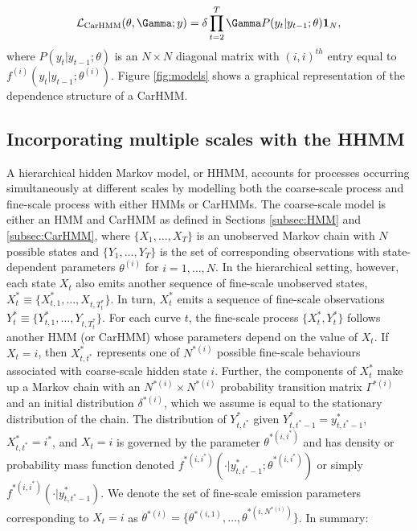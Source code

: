 \begin{equation*}
    \calL_{\text{CarHMM}}(\theta,\Gamma;y) = \delta \prod_{t=2}^T \Gamma P(y_t|y_{t-1};\theta) \mathbf{1}_N,
    \label{eqn:CarHMM_likelihood}
\end{equation*}
where
%
$P(y_t|y_{t-1};\theta)$ is an $N \times N$ diagonal matrix with $(i,i)^{th}$ entry equal to $f^{(i)}(y_t|y_{t-1}; \theta^{(i)})$. Figure \ref{fig:models} shows a graphical representation of the dependence structure of a CarHMM. 

\subsection{Incorporating multiple scales with the HHMM}
\label{subsec:HHMM}

A hierarchical hidden Markov model, or HHMM, accounts for processes occurring simultaneously at different scales by modelling both the coarse-scale process and fine-scale process with either HMMs \citep{Barajas:2017,Adam:2019} or CarHMMs. The coarse-scale model is either an HMM and CarHMM as defined in Sections \ref{subsec:HMM} and \ref{subsec:CarHMM}, where $\{X_1, \ldots, X_T\}$ is an unobserved Markov chain with $N$ possible states and $\{Y_1, \ldots, Y_T\}$ is the set of corresponding observations with state-dependent parameters $\theta^{(i)}$ for $i = 1,\ldots,N$.   
%
In the hierarchical setting, however, each state $X_t$ also emits another sequence of fine-scale unobserved states, $X^*_t \equiv \{X_{t,1}^*,\ldots, X_{t,T_t^*}\}$. In turn, $X^*_t$ emits a sequence of fine-scale observations $Y^*_t \equiv \{Y_{t,1}^*,\ldots, Y_{t,T_t^*}\}$. For each curve $t$, the fine-scale process $\{X^*_t, Y^*_t\}$ follows another HMM (or CarHMM) whose parameters depend on the value of $X_t$. If $X_t = i$, then $X^*_{t,t^*}$ represents one of $N^{*(i)}$ possible fine-scale behaviours associated with coarse-scale hidden state $i$. Further, the components of $X^*_t$ make up a Markov chain with an $N^{*(i)} \times N^{*(i)}$ probability transition matrix $\Gamma^{*(i)}$ and an initial distribution $\delta^{*(i)}$, which we assume is equal to the stationary distribution of the chain. The distribution of $Y^*_{t,t^*}$ given $Y^*_{t,t^*-1} = y^*_{t,t^*-1}$, $X^*_{t,t^*}=i^*$, and $X_t=i$ is governed by the parameter $\theta^{*(i,i^*)}$ and has density or probability mass function denoted $f^{*(i,i^*)}\left(\cdot|y^*_{t,t^*-1}; \theta^{*(i,i^*)}\right)$ or simply $f^{*(i,i^*)}(\cdot|y^*_{t,t^*-1})$. We denote the set of fine-scale emission parameters corresponding to $X_t=i$ as $\theta^{*(i)}=\big\{\theta^{*(i,1)}, \ldots, \theta^{*\left(i,N^{*(i)}\right)}\big\}$. In summary:

